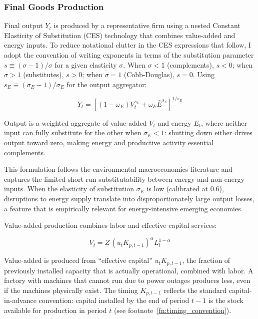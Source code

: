 \documentclass[12pt, a4paper]{article}
\begin{document}
	\subsubsection{Final Goods Production}
	
	Final output $Y_t$ is produced by a representative firm using a nested Constant Elasticity of Substitution (CES) technology that combines value-added and energy inputs. To reduce notational clutter in the CES expressions that follow, I adopt the convention of writing exponents in terms of the substitution parameter $s \equiv (\sigma - 1)/\sigma$ for a given elasticity $\sigma$. When $\sigma < 1$ (complements), $s < 0$; when $\sigma > 1$ (substitutes), $s > 0$; when $\sigma = 1$ (Cobb-Douglas), $s = 0$. Using $s_E \equiv (\sigma_E - 1)/\sigma_E$ for the output aggregator:
	
	\begin{equation}
		Y_t = \left[(1-\omega_E)V_t^{s_E} + \omega_E \bar{E}^{s_E}\right]^{1/s_E}
		\label{eq:final_output}
	\end{equation}
	
	Output is a weighted aggregate of value-added $V_t$ and energy $E_t$, where neither input can fully substitute for the other when $\sigma_E < 1$: shutting down either drives output toward zero, making energy and productive activity essential complements.
	
	This formulation follows the environmental macroeconomics literature \citep{heutel2012, airaudo2025green} and captures the limited short-run substitutability between energy and non-energy inputs. When the elasticity of substitution $\sigma_E$ is low (calibrated at 0.6), disruptions to energy supply translate into disproportionately large output losses, a feature that is empirically relevant for energy-intensive emerging economies.
	
	Value-added production combines labor and effective capital services:
	
	\begin{equation}
		V_t = Z\,(u_t K_{p,t-1})^\alpha L_t^{1-\alpha}
		\label{eq:value_added}
	\end{equation}
	
	Value-added is produced from ``effective capital'' $u_t K_{p,t-1}$, the fraction of previously installed capacity that is actually operational, combined with labor. A factory with machines that cannot run due to power outages produces less, even if the machines physically exist. The timing $K_{p,t-1}$ reflects the standard capital-in-advance convention: capital installed by the end of period $t-1$ is the stock available for production in period $t$ (see footnote~\ref{fn:timing_convention}).
	
\end{document}
